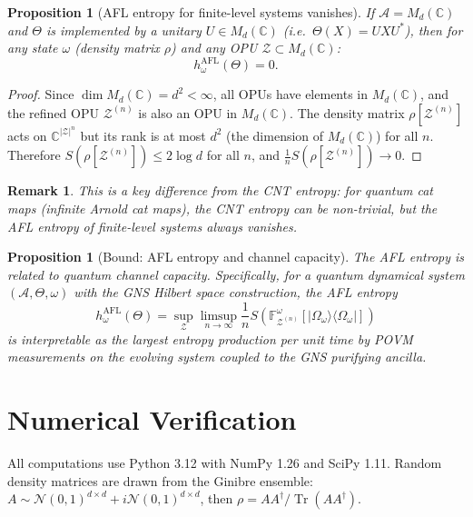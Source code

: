 \documentclass[12pt,a4paper]{article}
\newtheorem{proposition}[theorem]{Proposition}
\newtheorem{remark}[theorem]{Remark}
\DeclareMathOperator{\Tr}{Tr}
\newcommand{\A}{\mathcal{A}}
\begin{document}
\begin{proposition}[AFL entropy for finite-level systems vanishes]
\label{prop:finite_AFL}
If $\A=M_d(\mathbb{C})$ and $\Theta$ is implemented by a unitary $U\in M_d(\mathbb{C})$
(i.e.\ $\Theta(X)=UXU^*$), then for any state $\omega$ (density matrix $\rho$)
and any OPU $\mathcal{Z}\subset M_d(\mathbb{C})$:
\[
  h_\omega^{\mathrm{AFL}}(\Theta) = 0.
\]
\end{proposition}
\begin{proof}
Since $\dim M_d(\mathbb{C})=d^2<\infty$, all OPUs have elements in
$M_d(\mathbb{C})$, and the refined OPU $\mathcal{Z}^{(n)}$ is also an OPU in
$M_d(\mathbb{C})$.  The density matrix $\rho[\mathcal{Z}^{(n)}]$ acts on
$\mathbb{C}^{|\mathcal{Z}|^n}$ but its rank is at most $d^2$ (the dimension of
$M_d(\mathbb{C})$) for all $n$.  Therefore $S(\rho[\mathcal{Z}^{(n)}])\leq
2\log d$ for all $n$, and $\frac{1}{n}S(\rho[\mathcal{Z}^{(n)}])\to 0$.
\end{proof}

\begin{remark}
This is a key difference from the CNT entropy: for quantum cat maps (infinite
Arnold cat maps), the CNT entropy can be non-trivial, but the AFL entropy of
finite-level systems always vanishes.
\end{remark}

\begin{proposition}[Bound: AFL entropy and channel capacity]\label{prop:capacity}
The AFL entropy is related to quantum channel capacity.  Specifically, for a
quantum dynamical system $(\A,\Theta,\omega)$ with the GNS Hilbert space
construction, the AFL entropy
\[
  h_\omega^{\mathrm{AFL}}(\Theta)
  = \sup_{\mathcal{Z}} \limsup_{n\to\infty}\frac{1}{n}S\!\left(\mathbb{F}_{\mathcal{Z}^{(n)}}^\omega[|\Omega_\omega\rangle\langle\Omega_\omega|]\right)
\]
is interpretable as the largest entropy production per unit time by POVM
measurements on the evolving system coupled to the GNS purifying ancilla.
\end{proposition}

\section{Numerical Verification}

All computations use Python 3.12 with NumPy 1.26 and SciPy 1.11.
Random density matrices are drawn from the Ginibre ensemble:
$A\sim\mathcal{N}(0,1)^{d\times d}+i\mathcal{N}(0,1)^{d\times d}$,
then $\rho=AA^\dagger/\Tr(AA^\dagger)$.
\end{document}
